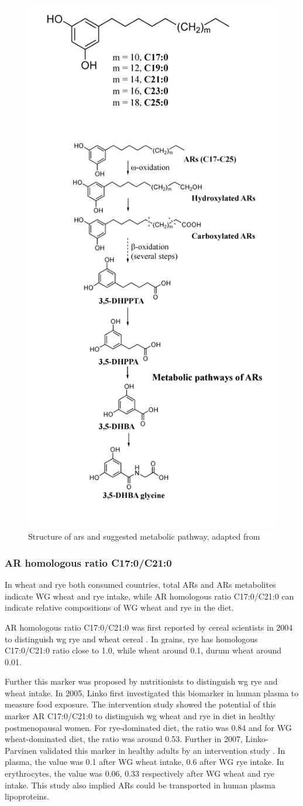 \begin{figure}[h!]
	\centering
	\includegraphics[width=0.5\linewidth]{picture/ars_sang_pathway}
	\caption{Structure of \acrshort{ars} and suggested metabolic pathway, adapted from \cite{ISI:000447355100002}}
	\label{fig:structure_ars}
\end{figure}

\subsubsection{AR homologous ratio C17:0/C21:0}
In wheat and rye both consumed countries, total ARs and ARs metabolites indicate WG wheat and rye intake, while AR homologous ratio C17:0/C21:0 can indicate relative compositions of WG wheat and rye in the diet.

AR homologous ratio C17:0/C21:0 was first reported by cereal scientists in 2004 to distinguish \acrshort{wg} rye and wheat cereal \cite{Chen2004}. In grains, rye has homologous C17:0/C21:0 ratio close to 1.0, while wheat around 0.1, durum wheat around 0.01.

Further this marker was proposed by nutritionists to distinguish \acrshort{wg} rye and wheat intake. In 2005, Linko\cite{ISI:000376712600013} first investigated this biomarker in human plasma to measure food exposure. The intervention study showed the potential of this marker AR C17:0/C21:0 to distinguish \acrshort{wg} wheat and rye in diet in healthy postmenopausal women. 
For rye-dominated diet, the ratio was 0.84 and for WG wheat-dominated diet, the ratio was around 0.53. 
Further in 2007, Linko-Parvinen validated this marker in healthy adults by an intervention study \cite{10.1093/jn/137.5.1137}.
In plasma, the value was 0.1 after WG wheat intake, 0.6 after WG rye intake. In erythrocytes, the value was 0.06, 0.33 respectively after WG wheat and rye intake. This study also implied ARs could be transported in human plasma lipoproteins.

